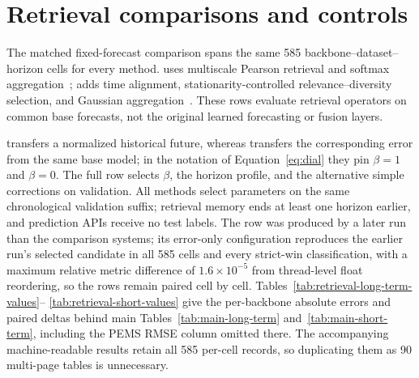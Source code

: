 \section{Retrieval comparisons and controls}
\label{app:retrieval-baselines}

The matched fixed-forecast comparison spans the same 585
backbone--dataset--horizon cells for every method. \raft{} uses multiscale
Pearson retrieval and softmax aggregation~\citep{han2025raft}; \saraf{} adds
time alignment, stationarity-controlled relevance--diversity selection, and
Gaussian aggregation~\citep{zhou2026saraf}. These rows evaluate retrieval
operators on common base forecasts, not the original learned forecasting
or fusion layers.

\analogknn{} transfers a normalized historical future, whereas \residualknn{}
transfers the corresponding error from the same base model; in the notation of
Equation~\ref{eq:dial} they pin $\beta=1$ and $\beta=0$. The full \method{} row
selects $\beta$, the horizon profile, and the alternative simple corrections on
validation. All methods select parameters on the same chronological validation
suffix; retrieval memory ends at least one horizon earlier, and prediction APIs
receive no test labels. The \method{} row was produced by a later run than the
comparison systems; its error-only configuration reproduces the earlier run's
selected candidate in all 585 cells and every strict-win classification, with a
maximum relative metric difference of $1.6\times10^{-5}$ from thread-level float
reordering, so the rows remain paired cell by cell.
Tables~\ref{tab:retrieval-long-term-values}--%
\ref{tab:retrieval-short-values} give the per-backbone absolute errors and
paired deltas behind main Tables~\ref{tab:main-long-term}
and~\ref{tab:main-short-term}, including the PEMS RMSE column omitted there.
The accompanying machine-readable results retain all 585 per-cell records, so
duplicating them as 90 multi-page tables is unnecessary.




